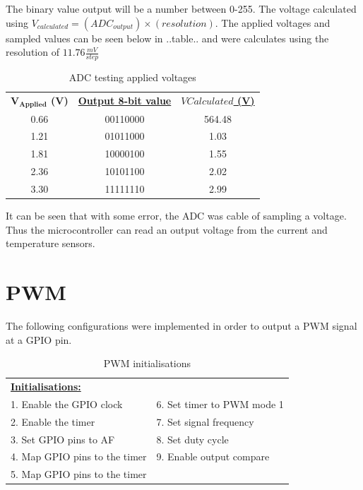 \vspace{-2mm}
The binary value output will be a number between 0-255. The voltage calculated using $V_{calculated} = (ADC_{output})\times(resolution) $. The applied voltages and sampled values can be seen below in ..table.. and were calculates using the resolution of $11.76\frac{mV}{step}$ 

\begin{table}[H]
\vspace{-2mm}
    \centering
    \begin{tabular}{ |c| c| c| }
        \hline
         \textbf{\underline{$\mathbf{V_{Applied}}$} (V)} & \textbf{\underline{Output 8-bit value}} & \textbf{\underline{$V{Calculated}$ (V)}} \\
         0.66 & 00110000 & 564.48 \\
         1.21 & 01011000 & 1.03 \\
         1.81 & 10000100 & 1.55 \\
         2.36 & 10101100 & 2.02 \\
         3.30 & 11111110 & 2.99 \\
         \hline
    \end{tabular}
    \vspace{-2mm}
    \caption{ADC testing applied voltages}
    \vspace{-3mm}
\end{table}
\vspace{-8mm}
It can be seen that with some error, the ADC was cable of sampling a voltage. Thus the microcontroller can read an output voltage from the current and temperature sensors.


\newpage
\section{PWM}
\vspace{-3mm}
The following configurations were implemented in order to output a PWM signal at a GPIO pin.

\begin{table}[H]
\centering
    \begin{tabular}{|l|l|}
    \hline
            \textbf{\underline{Initialisations:}}&\\
            1. Enable the GPIO clock        & 6. Set timer to PWM mode 1\\
            2. Enable the timer             & 7. Set signal frequency\\
            3. Set GPIO pins to AF          & 8. Set duty cycle\\
            4. Map GPIO pins to the timer   & 9. Enable output compare\\
            5. Map GPIO pins to the timer   & \\
                                  \hline
    \end{tabular}
    \caption{PWM initialisations}
\end{table}

